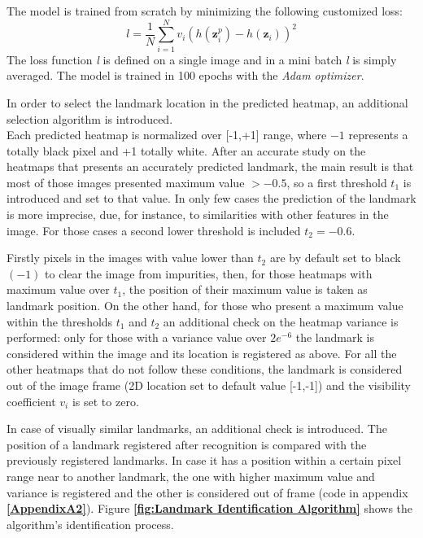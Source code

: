 The model is trained from scratch by minimizing the following customized loss:
\begin{equation}
l = \frac{1}{N}\sum_{i=1}^N v_i(h(\textbf{z}_{i}^p) - h(\textbf{z}_{i}))^2
\end{equation}
The loss function \textit{l} is defined on a single image and in a mini batch \textit{l} is simply averaged. The model is trained in 100 epochs with the \textit{Adam optimizer}\cite{kingma2017adam}.

In order to select the landmark location in the predicted heatmap, an additional selection algorithm is introduced.\\
Each predicted heatmap is normalized over [-1,+1] range, where \(-1\) represents a totally black pixel and +1 totally white. After an accurate study on the heatmaps that presents an accurately predicted landmark, the main result is that most of those images presented maximum value \(>-0.5\), so a first threshold \(t_1\) is introduced and set to that value. In only few cases the prediction of the landmark is more imprecise, due, for instance, to similarities with other features in the image. For those cases a second lower threshold is included \(t_2 = -0.6\).

Firstly pixels in the images with value lower than \(t_2\) are by default set to black \((-1)\) to clear the image from impurities, then, for those heatmaps with maximum value over \(t_1\), the position of their maximum value is taken as landmark position. On the other hand, for those who present a maximum value within the thresholds \(t_1\) and \(t_2\) an additional check on the heatmap variance is performed: only for those with a variance value over \(2e^{-6}\) the landmark is considered within the image and its location is registered as above. For all the other heatmaps that do not follow these conditions, the landmark is considered out of the image frame (2D location set to default value [-1,-1]) and the visibility coefficient \(v_{i}\) is set to zero.

In case of visually similar landmarks, an additional check is introduced. The position of a landmark registered after recognition is compared with the previously registered landmarks. In case it has a position within a certain pixel range near to another landmark, the one with higher maximum value and variance is registered and the other is considered out of frame (code in appendix \textbf{\ref{AppendixA2}}). Figure \textbf{\ref{fig:Landmark Identification Algorithm}} shows the algorithm's identification process.

